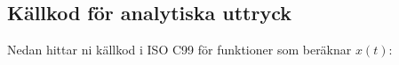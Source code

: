 \subsection{Källkod för analytiska uttryck}
Nedan hittar ni källkod i ISO C99 för funktioner som beräknar $x(t)$:

\inputminted[fontsize=\footnotesize]{c}{derivations/analytic.c}
